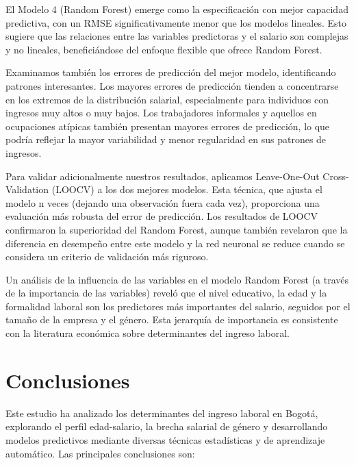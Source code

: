 \documentclass[12pt,a4paper,onecolumn]{article}
\begin{document}
El Modelo 4 (Random Forest) emerge como la especificación con mejor capacidad predictiva, con un RMSE significativamente menor que los modelos lineales. Esto sugiere que las relaciones entre las variables predictoras y el salario son complejas y no lineales, beneficiándose del enfoque flexible que ofrece Random Forest.

Examinamos también los errores de predicción del mejor modelo, identificando patrones interesantes. Los mayores errores de predicción tienden a concentrarse en los extremos de la distribución salarial, especialmente para individuos con ingresos muy altos o muy bajos. Los trabajadores informales y aquellos en ocupaciones atípicas también presentan mayores errores de predicción, lo que podría reflejar la mayor variabilidad y menor regularidad en sus patrones de ingresos.

Para validar adicionalmente nuestros resultados, aplicamos Leave-One-Out Cross-Validation (LOOCV) a los dos mejores modelos. Esta técnica, que ajusta el modelo n veces (dejando una observación fuera cada vez), proporciona una evaluación más robusta del error de predicción. Los resultados de LOOCV confirmaron la superioridad del Random Forest, aunque también revelaron que la diferencia en desempeño entre este modelo y la red neuronal se reduce cuando se considera un criterio de validación más riguroso.

Un análisis de la influencia de las variables en el modelo Random Forest (a través de la importancia de las variables) reveló que el nivel educativo, la edad y la formalidad laboral son los predictores más importantes del salario, seguidos por el tamaño de la empresa y el género. Esta jerarquía de importancia es consistente con la literatura económica sobre determinantes del ingreso laboral.

\section{Conclusiones}

Este estudio ha analizado los determinantes del ingreso laboral en Bogotá, explorando el perfil edad-salario, la brecha salarial de género y desarrollando modelos predictivos mediante diversas técnicas estadísticas y de aprendizaje automático. Las principales conclusiones son:
\end{document}
